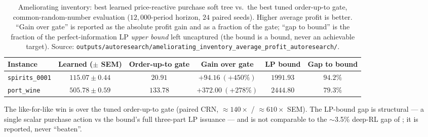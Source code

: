 \begin{table}[!htbp]
\centering
\small
\caption{Ameliorating inventory: best learned price-reactive purchase soft tree vs.\ the best tuned
order-up-to gate, common-random-number evaluation ($12{,}000$-period horizon, $24$ paired seeds).
Higher average profit is better. ``Gain over gate'' is reported as the absolute profit gain and as a
fraction of the gate; ``gap to bound'' is the fraction of the perfect-information LP \emph{upper bound}
left uncaptured (the bound is a bound, never an achievable target). Source:
\texttt{outputs/autoresearch/ameliorating\_inventory\_average\_profit\_autoresearch/}.}
\label{tab:amelior-results}
\begin{tabular}{lccccc}
\toprule
Instance & Learned ($\pm$ SEM) & Order-up-to gate & Gain over gate & LP bound & Gap to bound \\
\midrule
\texttt{spirits\_0001} & $\mathbf{115.07\pm0.44}$ & $20.91$  & $+94.16\ (+450\%)$ & $1991.93$ & $94.2\%$ \\
\texttt{port\_wine}    & $\mathbf{505.78\pm0.59}$ & $133.78$ & $+372.00\ (+278\%)$ & $2444.80$ & $79.3\%$ \\
\bottomrule
\end{tabular}
\par\medskip\footnotesize The like-for-like win is over the tuned order-up-to gate (paired CRN,
$\approx140\times$ / $\approx610\times$ SEM). The LP-bound gap is structural --- a single scalar
purchase action vs the bound's full three-part LP issuance --- and is not comparable to the
$\sim$3.5\% deep-RL gap of \citet{pahrGrunow2025}; it is reported, never ``beaten''.
\end{table}
\FloatBarrier
